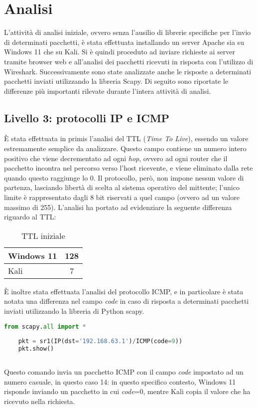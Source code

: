 \chapter{Analisi}
L'attività di analisi iniziale, ovvero senza l'ausilio di librerie specifiche per l'invio di determinati pacchetti, è stata effettuata installando un server Apache sia su Windows 11 che su Kali.
Si è quindi proceduto ad inviare richieste ai server tramite browser web e all'analisi dei pacchetti ricevuti in risposta con l'utilizzo di Wireshark.
Successivamente sono state analizzate anche le risposte a determinati pacchetti inviati utilizzando la libreria Scapy.
Di seguito sono riportate le differenze più importanti rilevate durante l'intera attività di analisi.


\section{Livello 3: protocolli IP e ICMP}
È stata effettuata in primis l'analisi del TTL (\textit{Time To Live}), essendo un valore estremamente semplice da analizzare.
Questo campo contiene un numero intero positivo che viene decrementato ad ogni \textit{hop}, ovvero ad ogni router che il pacchetto incontra nel percorso verso l'host ricevente, e viene eliminato dalla rete quando questo raggiunge lo 0.
Il protocollo, però, non impone nessun valore di partenza, lasciando libertà di scelta al sistema operativo del mittente; l'unico limite è rappresentato dagli 8 bit riservati a quel campo (ovvero ad un valore massimo di 255).
L'analisi ha portato ad evidenziare la seguente differenza riguardo al TTL:
\begin{table}[H]
	\centering
	\begin{tabular}{ l | c }
		\hline
		\rowcolor{blue!10} Windows 11 & 128
		\\
		\hline
		\rowcolor{red!10} Kali & 7
		\\
		\hline
		
	\end{tabular}
	\caption{TTL iniziale}
	\label{tab:TTL}
\end{table}

È inoltre stata effettuata l'analisi del protocollo ICMP, e in particolare è stata notata una differenza nel campo \textit{code} in caso di risposta a determinati pacchetti inviati utilizzando la libreria di Python scapy.
\\

\begin{lstlisting}[language=Python, caption={Comando Python per l'invio del pacchetto}]
	from scapy.all import *
	
	pkt = sr1(IP(dst='192.168.63.1')/ICMP(code=9))
	pkt.show()
	
\end{lstlisting}
Questo comando invia un pacchetto ICMP con il campo \textit{code} impostato ad un numero casuale, in questo caso 14: in questo specifico contesto, Windows 11 risponde inviando un pacchetto in cui \textit{code}=0, mentre Kali copia il valore che ha ricevuto nella richiesta.

